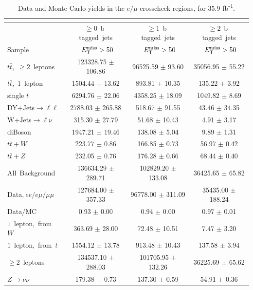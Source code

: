 \begin{table}[htb]
\centering
\caption{Data and Monte Carlo yields in the $e/\mu$ crosscheck
  regions, for 35.9 fb\textsuperscript{-1}.}
\label{tab:emu:yields}
\begin{tabular}{|l|c|c|c|}

\multicolumn{4}{c}{}\\* \hline
  & $\ge0$~b-tagged~jets & $\ge1$~b-tagged~jets  & $\ge2$~b-tagged~jets \\*
Sample  & ~$E_\text{T}^\text{miss}>50$ & ~$E_\text{T}^\text{miss}>50$  & ~$E_\text{T}^\text{miss}>50$ \\*
\hline \hline

$t\bar{t}$,~$\ge2$~leptons & 123328.75 $\pm$ 106.86  & 96525.59 $\pm$ 93.60  & 35056.95 $\pm$ 55.22 \\*
$t\bar{t}$,~$1$~lepton & 1504.44 $\pm$ 13.62  & 893.81 $\pm$ 10.35  & 135.22 $\pm$ 3.92 \\*
single $t$  & 6294.76 $\pm$ 22.06  & 4358.25 $\pm$ 18.09  & 1049.82 $\pm$ 8.69 \\*
DY+Jets$\rightarrow\ell\ell$  & 2788.03 $\pm$ 265.88  & 518.67 $\pm$ 91.55  & 43.46 $\pm$ 34.35 \\*
W+Jets$\rightarrow\ell\nu$  & 315.30 $\pm$ 27.79  & 51.68 $\pm$ 10.43  & 4.91 $\pm$ 3.17 \\*
diBoson  & 1947.21 $\pm$ 19.46  & 138.08 $\pm$ 5.04  & 9.89 $\pm$ 1.31 \\*
$t\bar{t}+W$  & 223.77 $\pm$ 0.86  & 166.85 $\pm$ 0.73  & 56.97 $\pm$ 0.42 \\*
$t\bar{t}+Z$  & 232.05 $\pm$ 0.76  & 176.28 $\pm$ 0.66  & 68.44 $\pm$ 0.40 \\*
\hline \hline
All~Background  & 136634.29 $\pm$ 289.71  & 102829.20 $\pm$ 133.08  & 36425.65 $\pm$ 65.82 \\*
Data,$~ee/e\mu/\mu\mu$  & 127684.00 $\pm$ 357.33  & 96778.00 $\pm$ 311.09  & 35435.00 $\pm$ 188.24 \\*
Data/MC  & 0.93 $\pm$ 0.00  & 0.94 $\pm$ 0.00  & 0.97 $\pm$ 0.01 \\*
\hline \hline
$1$~lepton,~from~$W$  & 363.69 $\pm$ 28.00  & 72.48 $\pm$ 10.51  & 7.47 $\pm$ 3.20 \\*
$1$~lepton,~from~$t$  & 1554.12 $\pm$ 13.78  & 913.48 $\pm$ 10.43  & 137.58 $\pm$ 3.94 \\*
$\ge2$~leptons  & 134537.10 $\pm$ 288.03  & 101705.95 $\pm$ 132.26  & 36225.69 $\pm$ 65.62 \\*
$Z\rightarrow\nu\nu$  & 179.38 $\pm$ 0.73  & 137.30 $\pm$ 0.59  & 54.91 $\pm$ 0.36 \\*
\hline
\end{tabular}
\end{table}

